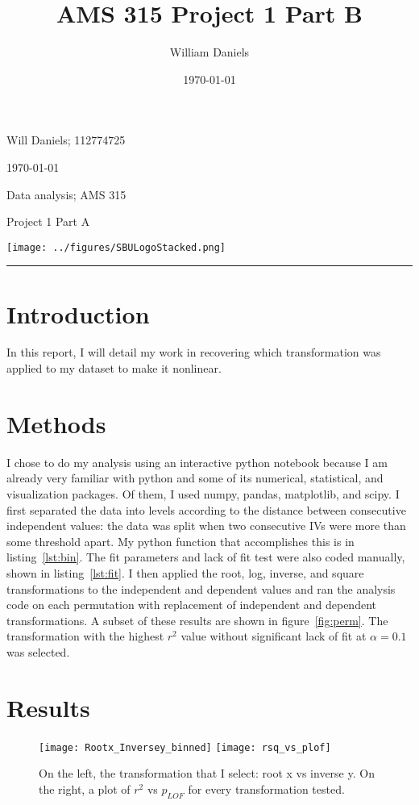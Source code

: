\documentclass[12pt, letterpaper]{article}
\title{AMS 315 Project 1 Part B}
\author{William Daniels}
\date{\today}
\begin{document}

\noindent
\begin{minipage}{0.7\textwidth}
    Will Daniels; 112774725

    \today

    Data analysis; AMS 315

    Project 1 Part A
\end{minipage}
%
\begin{minipage}{0.3\textwidth}
    \begin{flushright}
        \texttt{[image: ../figures/SBULogoStacked.png]}
    \end{flushright}
\end{minipage}
\noindent
\rule{\textwidth}{1pt}

\section*{Introduction}
In this report, I will detail my work in recovering which transformation was applied to my dataset to make it nonlinear.

\section*{Methods}
I chose to do my analysis using an interactive python notebook because I am already very familiar with python and some of its numerical, statistical, and visualization packages.
Of them, I used numpy, pandas, matplotlib, and scipy.
I first separated the data into levels according to the distance between consecutive independent values: the data was split when two consecutive IVs were more than some threshold apart.
My python function that accomplishes this is in listing~\ref{lst:bin}.
The fit parameters and lack of fit test were also coded manually, shown in listing~\ref{lst:fit}.
I then applied the root, log, inverse, and square transformations to the independent and dependent values and ran the analysis code on each permutation with replacement of independent and dependent transformations.
A subset of these results are shown in figure~\ref{fig:perm}.
The transformation with the highest \(r^2\) value without significant lack of fit at \(\alpha=0.1\) was selected.

\section*{Results}
\begin{figure}[!b]
    \centering
    \texttt{[image: Rootx\_Inversey\_binned]}
    \texttt{[image: rsq\_vs\_plof]}
    \caption{On the left, the transformation that I select: root x vs inverse y. On the right, a plot of \(r^2\) vs \(p_{LOF}\) for every transformation tested.}
    \label{fig:results}
\end{figure}
\end{document}
